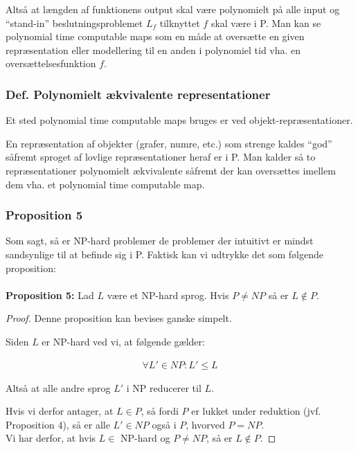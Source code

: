 Altså at længden af funktionens output skal være polynomielt på alle input og ``stand-in'' beslutningsproblemet $L_f$ tilknyttet $f$ skal være i P. Man kan se polynomial time computable maps som en måde at oversætte en given repræsentation eller modellering til en anden i polynomiel tid vha. en oversættelsesfunktion $f$.

\subsubsection{Def. Polynomielt ækvivalente representationer}

Et sted polynomial time computable maps bruges er ved objekt-repræsentationer.

En repræsentation af objekter (grafer, numre, etc.) som strenge kaldes ``god'' såfremt sproget af lovlige repræsentationer heraf er i P. Man kalder så to repræsentationer polynomielt ækvivalente såfremt der kan oversættes imellem dem vha. et polynomial time computable map.





\subsubsection{Proposition 5}

Som sagt, så er NP-hard problemer de problemer der intuitivt er mindst sandsynlige til at befinde sig i P. Faktisk kan vi udtrykke det som følgende proposition:\\
~\\
\textbf{Proposition 5:} Lad $L$ være et NP-hard sprog. Hvis $P \neq NP$ så er $L \notin P$.

\begin{proof}
 Denne proposition kan bevises ganske simpelt. 

Siden $L$ er NP-hard ved vi, at følgende gælder:

\begin{align*}
 \forall L' \in NP : L' \leq L
\end{align*}

Altså at alle andre sprog $L'$ i NP reducerer til $L$.

Hvis vi derfor antager, at $L \in P$, så fordi $P$ er lukket under reduktion (jvf. Proposition 4), så er alle $L' \in NP$ også i $P$, hvorved $P=NP$. \\

Vi har derfor, at hvis $L \in$ NP-hard og $P \neq NP$, så er $L \notin P$.

\end{proof}


